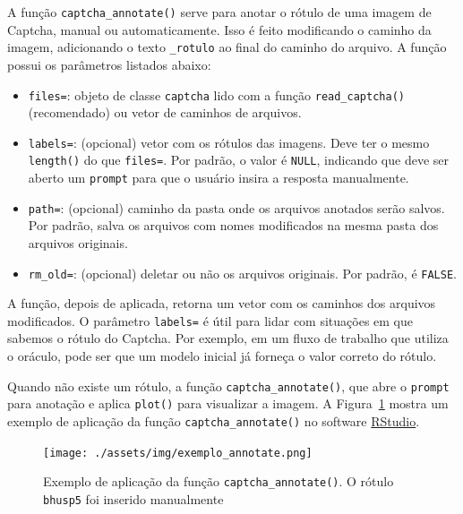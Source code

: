 \documentclass[12pt,twoside,brazilian]{book}
\providecommand{\tightlist}{%
  \setlength{\itemsep}{0pt}\setlength{\parskip}{0pt}}
\begin{document}
A função \texttt{captcha\_annotate()} serve para anotar o rótulo de uma
imagem de Captcha, manual ou automaticamente. Isso é feito modificando o
caminho da imagem, adicionando o texto \texttt{\_rotulo} ao final do
caminho do arquivo. A função possui os parâmetros listados abaixo:

\begin{itemize}
\tightlist
\item
  \texttt{files=}: objeto de classe \texttt{captcha} lido com a função
  \texttt{read\_captcha()} (recomendado) ou vetor de caminhos de
  arquivos.
\item
  \texttt{labels=}: (opcional) vetor com os rótulos das imagens. Deve
  ter o mesmo \texttt{length()} do que \texttt{files=}. Por padrão, o
  valor é \texttt{NULL}, indicando que deve ser aberto um
  \texttt{prompt} para que o usuário insira a resposta manualmente.
\item
  \texttt{path=}: (opcional) caminho da pasta onde os arquivos anotados
  serão salvos. Por padrão, salva os arquivos com nomes modificados na
  mesma pasta dos arquivos originais.
\item
  \texttt{rm\_old=}: (opcional) deletar ou não os arquivos originais.
  Por padrão, é \texttt{FALSE}.
\end{itemize}

A função, depois de aplicada, retorna um vetor com os caminhos dos
arquivos modificados. O parâmetro \texttt{labels=} é útil para lidar com
situações em que sabemos o rótulo do Captcha. Por exemplo, em um fluxo
de trabalho que utiliza o oráculo, pode ser que um modelo inicial já
forneça o valor correto do rótulo.

Quando não existe um rótulo, a função \texttt{captcha\_annotate()}, que
abre o \texttt{prompt} para anotação e aplica \texttt{plot()} para
visualizar a imagem. A Figura~\ref{fig-exemplo-annotate} mostra um
exemplo de aplicação da função \texttt{captcha\_annotate()} no software
\href{https://posit.co/download/rstudio-desktop/}{RStudio}.

\begin{figure}

{\centering \texttt{[image: ./assets/img/exemplo\_annotate.png]}

}

\caption{\label{fig-exemplo-annotate}Exemplo de aplicação da função
\texttt{captcha\_annotate()}. O rótulo \texttt{bhusp5} foi inserido
manualmente}

\end{figure}
\end{document}
